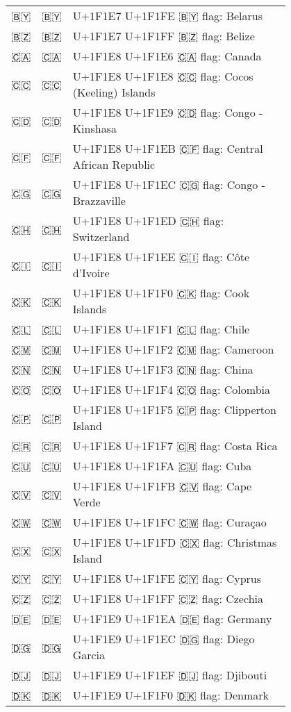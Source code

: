 \documentclass[a4paper,12pt]{article}
\newcommand{\fontA}[1]{{\fontspec[RawFeature={mode=harf,+dist,+ccmp}]{Segoe UI Emoji} #1}}
\newcommand{\fontB}[1]{{\fontspec[RawFeature={mode=harf,+dist,+ccmp}]{Noto Color Emoji} #1}}
\begin{document}
\begin{longtable}[c]{ccp{0.8\linewidth}}
\fontA{🇧🇾}&\fontB{🇧🇾}&U+1F1E7 U+1F1FE 🇧🇾 flag: Belarus\\
\fontA{🇧🇿}&\fontB{🇧🇿}&U+1F1E7 U+1F1FF 🇧🇿 flag: Belize\\
\fontA{🇨🇦}&\fontB{🇨🇦}&U+1F1E8 U+1F1E6 🇨🇦 flag: Canada\\
\fontA{🇨🇨}&\fontB{🇨🇨}&U+1F1E8 U+1F1E8 🇨🇨 flag: Cocos (Keeling) Islands\\
\fontA{🇨🇩}&\fontB{🇨🇩}&U+1F1E8 U+1F1E9 🇨🇩 flag: Congo - Kinshasa\\
\fontA{🇨🇫}&\fontB{🇨🇫}&U+1F1E8 U+1F1EB 🇨🇫 flag: Central African Republic\\
\fontA{🇨🇬}&\fontB{🇨🇬}&U+1F1E8 U+1F1EC 🇨🇬 flag: Congo - Brazzaville\\
\fontA{🇨🇭}&\fontB{🇨🇭}&U+1F1E8 U+1F1ED 🇨🇭 flag: Switzerland\\
\fontA{🇨🇮}&\fontB{🇨🇮}&U+1F1E8 U+1F1EE 🇨🇮 flag: Côte d’Ivoire\\
\fontA{🇨🇰}&\fontB{🇨🇰}&U+1F1E8 U+1F1F0 🇨🇰 flag: Cook Islands\\
\fontA{🇨🇱}&\fontB{🇨🇱}&U+1F1E8 U+1F1F1 🇨🇱 flag: Chile\\
\fontA{🇨🇲}&\fontB{🇨🇲}&U+1F1E8 U+1F1F2 🇨🇲 flag: Cameroon\\
\fontA{🇨🇳}&\fontB{🇨🇳}&U+1F1E8 U+1F1F3 🇨🇳 flag: China\\
\fontA{🇨🇴}&\fontB{🇨🇴}&U+1F1E8 U+1F1F4 🇨🇴 flag: Colombia\\
\fontA{🇨🇵}&\fontB{🇨🇵}&U+1F1E8 U+1F1F5 🇨🇵 flag: Clipperton Island\\
\fontA{🇨🇷}&\fontB{🇨🇷}&U+1F1E8 U+1F1F7 🇨🇷 flag: Costa Rica\\
\fontA{🇨🇺}&\fontB{🇨🇺}&U+1F1E8 U+1F1FA 🇨🇺 flag: Cuba\\
\fontA{🇨🇻}&\fontB{🇨🇻}&U+1F1E8 U+1F1FB 🇨🇻 flag: Cape Verde\\
\fontA{🇨🇼}&\fontB{🇨🇼}&U+1F1E8 U+1F1FC 🇨🇼 flag: Curaçao\\
\fontA{🇨🇽}&\fontB{🇨🇽}&U+1F1E8 U+1F1FD 🇨🇽 flag: Christmas Island\\
\fontA{🇨🇾}&\fontB{🇨🇾}&U+1F1E8 U+1F1FE 🇨🇾 flag: Cyprus\\
\fontA{🇨🇿}&\fontB{🇨🇿}&U+1F1E8 U+1F1FF 🇨🇿 flag: Czechia\\
\fontA{🇩🇪}&\fontB{🇩🇪}&U+1F1E9 U+1F1EA 🇩🇪 flag: Germany\\
\fontA{🇩🇬}&\fontB{🇩🇬}&U+1F1E9 U+1F1EC 🇩🇬 flag: Diego Garcia\\
\fontA{🇩🇯}&\fontB{🇩🇯}&U+1F1E9 U+1F1EF 🇩🇯 flag: Djibouti\\
\fontA{🇩🇰}&\fontB{🇩🇰}&U+1F1E9 U+1F1F0 🇩🇰 flag: Denmark\\

\end{longtable}
\end{document}
